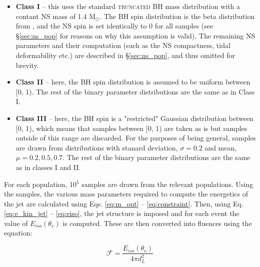     \begin{itemize}

        \item \textbf{Class I} -- this uses the standard \textsc{truncated} BH mass
            distribution with a contant NS mass of 1.4 M$_\odot$. The BH spin
            distribution is the beta distribution from \cite{abbott_2020B}, and the NS
            spin is set identically to 0 for all samples (see \S\ref{sec:ns_pop}
            for reasons on why this assumption is valid). The remaining NS parameters
            and their computation (such as the NS compactness, tidal deformability etc.)
            are described in \S\ref{sec:ns_pop}, and thus omitted for brevity.

        \item \textbf{Class II} -- here, the BH spin distribution is assumed to be
            uniform between [0, 1). The rest of the binary parameter distributions are
            the same as in Class I.

        \item \textbf{Class III} -- here, the BH spin is a "restricted" Gaussian
            distribution between [0, 1), which means that samples between [0, 1) are
            taken as is but samples outside of this range are discarded.  For the
            purposes of being general, samples are drawn from distributions with stanard
            deviation, $\sigma = 0.2$ and mean, $\mu = 0.2, 0.5, 0.7$.  The rest of the
            binary parameter distributions are the same as in classes I and II.

    \end{itemize}

    For each population, 10$^5$ samples are drawn from the relevant populations. Using
    the samples, the various mass parameters required to compute the energetics of the
    jet are calculated using Eqs. \ref{eq:m_out} -- \ref{eq:constraint}. Then, using Eq.
    \ref{eq:e_kin_jet} -- \ref{eq:eiso}, the jet structure is imposed and for each event
    the value of $E_{iso}(\theta_v)$ is computed. These are then converted into fluences
    using the equation:

    \begin{equation}
        \mathcal{F} = \dfrac{E_{iso}(\theta_v)}{4\pi d_L^2}
    \end{equation}

